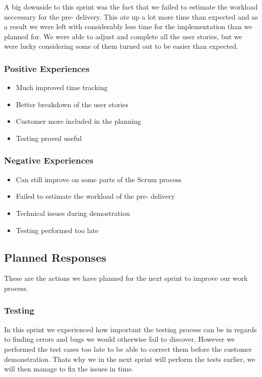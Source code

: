 \newline
\newline
A big downside to this sprint was the fact that we failed to estimate the workload neccessary for the pre- delivery. This ate up a lot more time than expected and as a result we were left with considerably less time for the implementation than we planned for. We were able to adjust and complete all the user stories, but we were lucky considering some of them turned out to be easier than expected.


\subsubsection{Positive Experiences}
\begin{itemize}
\item Much improved time tracking
\item Better breakdown of the user stories
\item Customer more included in the planning
\item Testing proved useful
\end{itemize}


\subsubsection{Negative Experiences}
\begin{itemize}
\item Can still improve on some parts of the Scrum process
\item Failed to estimate the workload of the pre- delivery
\item Technical issues during demostration
\item Testing performed too late
\end{itemize}

\subsection{Planned Responses}
These are the actions we have planned for the next sprint to improve our work process.

\subsubsection{Testing}
In this sprint we experienced how important the testing process can be in regards to finding errors and bugs we would otherwise fail to discover. However we performed the test cases too late to be able to correct them before the customer demonstration. Thats why we in the next sprint will perform the tests earlier, we will then manage to fix the issues in time.


